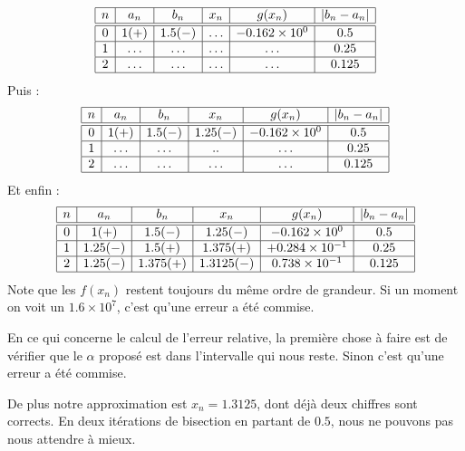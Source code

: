 \begin{example}
	\begin{equation*}
		\begin{array}[]{|c|c|c|c|c|c|}
			\hline
			n & a_n    & b_n     & x_n    & g(x_n)              & | b_n-a_n | \\
			\hline\hline
			0 & 1 (+)  & 1.5 (-) & \ldots & -0.162\times 10^{0} & 0.5         \\
			\hline
			1 & \ldots & \ldots  & \ldots & \ldots              & 0.25        \\
			\hline
			2 & \ldots & \ldots  & \ldots & \ldots              & 0.125       \\
			\hline
		\end{array}
	\end{equation*}
	Puis :
	\begin{equation*}
		\begin{array}[]{|c|c|c|c|c|c|}
			\hline
			n & a_n    & b_n     & x_n      & g(x_n)              & | b_n-a_n | \\
			\hline\hline
			0 & 1 (+)  & 1.5 (-) & 1.25 (-) & -0.162\times 10^{0} & 0.5         \\
			\hline
			1 & \ldots & \ldots  & ..       & \ldots              & 0.25        \\
			\hline
			2 & \ldots & \ldots  & \ldots   & \ldots              & 0.125       \\
			\hline
		\end{array}
	\end{equation*}
	Et enfin :
	\begin{equation*}
		\begin{array}[]{|c|c|c|c|c|c|}
			\hline
			n & a_n      & b_n      & x_n       & g(x_n)               & | b_n-a_n | \\
			\hline\hline
			0 & 1 (+)    & 1.5 (-)  & 1.25 (-)  & -0.162\times 10^{0}  & 0.5         \\
			\hline
			1 & 1.25 (-) & 1.5(+)   & 1.375(+)  & +0.284\times 10^{-1} & 0.25        \\
			\hline
			2 & 1.25(-)  & 1.375(+) & 1.3125(-) & 0.738\times 10^{-1}  & 0.125       \\
			\hline
		\end{array}
	\end{equation*}
	Note que les \( f(x_n)\) restent toujours du même ordre de grandeur. Si un moment on voit un \( 1.6\times 10^{7}\), c'est qu'une erreur a été commise.

	En ce qui concerne le calcul de l'erreur relative, la première chose à faire est de vérifier que le \( \alpha\) proposé est dans l'intervalle qui nous reste. Sinon c'est qu'une erreur a été commise.

	De plus notre approximation est \( x_n=1.3125\), dont déjà deux chiffres sont corrects. En deux itérations de bisection en partant de \( 0.5\), nous ne pouvons pas nous attendre à mieux.

\end{example}


